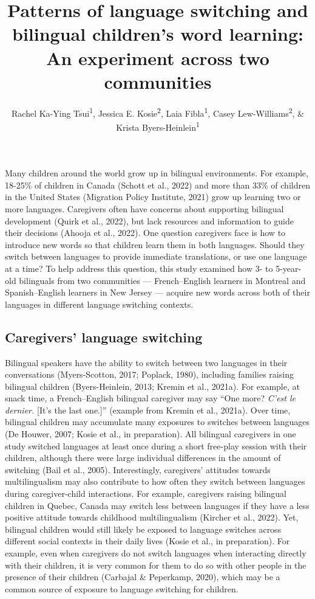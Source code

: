 \documentclass[
  man,floatsintext]{apa7}
\title{Patterns of language switching and bilingual children's word learning: An experiment across two communities}
\author{Rachel Ka-Ying Tsui\textsuperscript{1}, Jessica E. Kosie\textsuperscript{2}, Laia Fibla\textsuperscript{1}, Casey Lew-Williams\textsuperscript{2}, \& Krista Byers-Heinlein\textsuperscript{1}}
\date{}
\affiliation{\vspace{0.5cm}\textsuperscript{1} Concordia University\\\textsuperscript{2} Princeton University}
\begin{document}
\maketitle

\captionsetup[table]{labelformat=empty}

Many children around the world grow up in bilingual environments. For example, 18-25\% of children in Canada (Schott et al., 2022) and more than 33\% of children in the United States (Migration Policy Institute, 2021) grow up learning two or more languages. Caregivers often have concerns about supporting bilingual development (Quirk et al., 2022), but lack resources and information to guide their decisions (Ahooja et al., 2022). One question caregivers face is how to introduce new words so that children learn them in both languages. Should they switch between languages to provide immediate translations, or use one language at a time? To help address this question, this study examined how 3- to 5-year-old bilinguals from two communities --- French--English learners in Montreal and Spanish--English learners in New Jersey --- acquire new words across both of their languages in different language switching contexts.

\hypertarget{caregivers-language-switching}{%
\subsection{Caregivers' language switching}\label{caregivers-language-switching}}

Bilingual speakers have the ability to switch between two languages in their conversations (Myers-Scotton, 2017; Poplack, 1980), including families raising bilingual children (Byers-Heinlein, 2013; Kremin et al., 2021a). For example, at snack time, a French--English bilingual caregiver may say ``One more? \emph{C'est le dernier.} {[}It's the last one.{]}'' (example from Kremin et al., 2021a). Over time, bilingual children may accumulate many exposures to switches between languages (De Houwer, 2007; Kosie et al., in preparation). All bilingual caregivers in one study switched languages at least once during a short free-play session with their children, although there were large individual differences in the amount of switching (Bail et al., 2005). Interestingly, caregivers' attitudes towards multilingualism may also contribute to how often they switch between languages during caregiver-child interactions. For example, caregivers raising bilingual children in Quebec, Canada may switch less between languages if they have a less positive attitude towards childhood multilingualism (Kircher et al., 2022). Yet, bilingual children would still likely be exposed to language switches across different social contexts in their daily lives (Kosie et al., in preparation). For example, even when caregivers do not switch languages when interacting directly with their children, it is very common for them to do so with other people in the presence of their children (Carbajal \& Peperkamp, 2020), which may be a common source of exposure to language switching for children.
\end{document}
